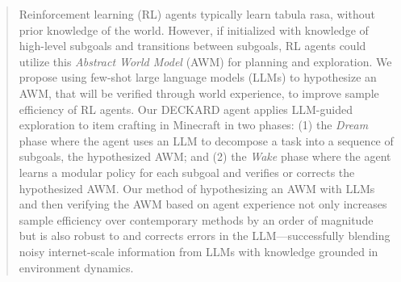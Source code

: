 \documentclass[nohyperref]{article}
\theoremstyle{plain}
\theoremstyle{definition}
\theoremstyle{remark}
\newcommand{\agentshort}{\textsc{DECKARD}}
\begin{document}

\printAffiliationsAndNotice{}

\begin{abstract}
    Reinforcement learning (RL) agents typically learn tabula rasa, without prior knowledge of the world.
    However, if initialized with knowledge of high-level subgoals and transitions between subgoals, RL agents could utilize this \emph{Abstract World Model} (AWM) for planning and exploration.
    We propose using few-shot large language models (LLMs) to hypothesize an AWM, that will be verified through world experience, to improve sample efficiency of RL agents.
    Our \agentshort{} agent applies LLM-guided exploration to item crafting in Minecraft in two phases: (1) the \emph{Dream} phase where the agent uses an LLM to decompose a task into a sequence of subgoals, the hypothesized AWM; and (2) the \emph{Wake} phase where the agent learns a modular policy for each subgoal and verifies or corrects the hypothesized AWM.
    Our method of hypothesizing an AWM with LLMs and then verifying the AWM based on agent experience not only increases sample efficiency over contemporary methods by an order of magnitude but is also robust to and corrects errors in the LLM---successfully blending noisy internet-scale information from LLMs with knowledge grounded in environment dynamics.
\end{abstract}
\end{document}
